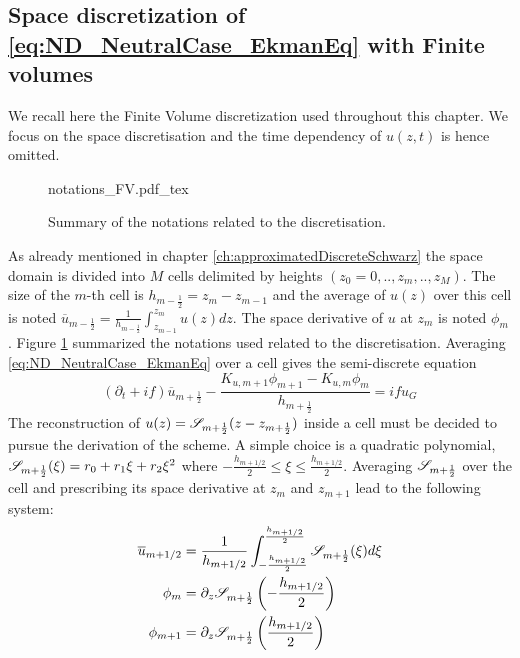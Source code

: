 \subsection{Space discretization of
\eqref{eq:ND_NeutralCase_EkmanEq} with Finite volumes}
\label{sec:ND_NeutralCase_recallSplines}
We recall here the Finite Volume discretization used throughout
this chapter. We focus on the space discretisation and the time
dependency of $u(z, t)$ is hence omitted.
\begin{figure}
	\centering
	{notations_FV.pdf_tex}
	\caption{Summary of the notations related to the discretisation.}
	\label{fig:ND_NeutralCase_summary_notations}
\end{figure}
\par
As already mentioned in chapter \ref{ch:approximatedDiscreteSchwarz}
the space domain is divided into $M$ cells delimited by
heights $(z_0=0, .., z_m, .., z_M)$. The size of the $m$-th cell
is $h_{m-\frac{1}{2}}=z_{m}-z_{m-1}$ and the average of $u(z)$
over this cell is noted
$\overline{u}_{m-\frac{1}{2}}=\frac{1} {h_{m-\frac{1}{2}}}
\int_{z_{m-1}}^{z_m}u(z)dz$.
The space derivative of $u$ at $z_m$ is noted $\phi_{m}$.
Figure \ref{fig:ND_NeutralCase_summary_notations} summarized
the notations used related to the discretisation.
Averaging \eqref{eq:ND_NeutralCase_EkmanEq} over a cell gives
the semi-discrete equation
\begin{equation}
\label{eq:ND_NeutralCase_semiDiscreteEkmanEq}
	(\partial_t + if) \overline{u}_{m+\frac{1}{2}} - 
	\frac{K_{u, m+1} \phi_{m+1} - K_{u, m} \phi_{m}}
		{h_{m+\frac{1}{2}}} = i f u_G
\end{equation}
The reconstruction of $u(z) = {\cal S}_{m+\frac{1}{2}}
				(z - z_{m+\frac{1}{2}})$
				inside a cell must be decided
to pursue the derivation of the scheme. A simple choice is
a quadratic polynomial,
${\cal S}_{m+\frac{1}{2}}(\xi) = r_0 + r_1 \xi + r_2 \xi^2$ where
$-\frac{h_{m+1/2}}{2} \leq \xi \leq \frac{h_{m+1/2}}{2}$.
Averaging ${\cal S}_{m+\frac{1}{2}}$ over the cell and
prescribing its space derivative at $z_{m}$ and $z_{m+1}$
lead to the following system:
\begin{equation}
	\begin{aligned}
		\overline{u}_{m+1/2} &= \frac{1}{h_{m+1/2}}
		\int_{-\frac{h_{m+1/2}}{2}}^{\frac{h_{m+1/2}}{2}}
		{\cal S}_{m+\frac{1}{2}}(\xi)d\xi\\
		\phi_m &= \partial_z {\cal S}_{m+\frac{1}{2}}
		\left(-\frac{h_{m+1/2}}{2}\right)\\
		\phi_{m+1} &=
		\partial_z {\cal S}_{m+\frac{1}{2}}
		\left(\frac{h_{m+1/2}}{2}\right)
	\end{aligned}
\end{equation}

